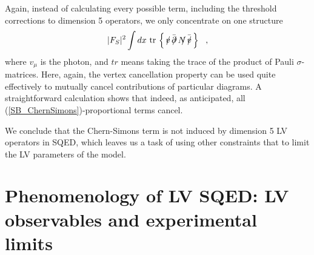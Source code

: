 \documentclass[12pt]{revtex4}
\newcommand{\slashed}[1]{\hbox{{$#1$}\llap{$/$}}}
\begin{document}
Again, instead of calculating every possible term, including the threshold corrections 
to dimension 5 operators, we only concentrate on one structure 
\begin{equation}
\label{SB_ChernSimons}
|F_S|^2 \int dx ~ \mathrm{tr} \,\left\{\, 
      \slashed{v} \, \bar{\slashed{\partial}} \,
      \slashed{N} \, \bar{\slashed{v}} \,
                              \right\}
~~,
\end{equation}
where $ v_\mu $ is the photon, and $ tr $ means
taking the trace of the product of Pauli 
$ \sigma $-matrices.
Here, again, the vertex cancellation property
can be used quite effectively to mutually cancel 
contributions of particular diagrams.
A straightforward calculation shows that indeed,
as anticipated, all (\ref{SB_ChernSimons})-proportional terms cancel.



We conclude that  the Chern-Simons term is not induced
by dimension 5 LV operators in SQED, which leaves us a task of 
    using other constraints that \cite{CFJ} to limit the LV parameters of the model.




\section{Phenomenology of LV SQED: LV observables and experimental limits}
\label{Reduction}
\end{document}
